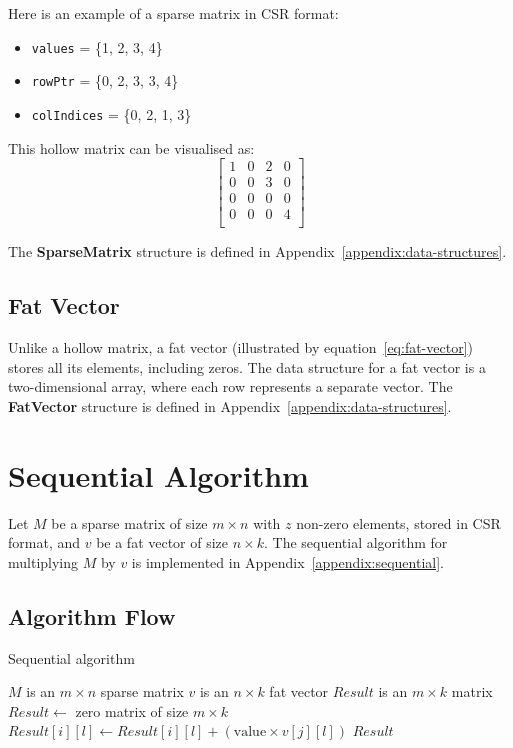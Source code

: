 \documentclass[12pt,oneside]{book} %
\begin{document}
Here is an example of a sparse matrix in CSR format:
\begin{itemize}
    \item \texttt{values} = \{1, 2, 3, 4\}
    \item \texttt{rowPtr} = \{0, 2, 3, 3, 4\}
    \item \texttt{colIndices} = \{0, 2, 1, 3\}
\end{itemize}

This hollow matrix can be visualised as:
\[
    \begin{bmatrix}
        1 & 0 & 2 & 0 \\
        0 & 0 & 3 & 0 \\
        0 & 0 & 0 & 0 \\
        0 & 0 & 0 & 4 \\
    \end{bmatrix}
\]

The \textbf{SparseMatrix} structure is defined in
Appendix~\ref{appendix:data-structures}.

\subsection{Fat Vector}
Unlike a hollow matrix, a fat vector (illustrated by
equation~\ref{eq:fat-vector}) stores all its elements, including zeros. The
data structure for a fat vector is a two-dimensional array, where each row
represents a separate vector. The \textbf{FatVector} structure is defined in
Appendix~\ref{appendix:data-structures}.

\section{Sequential Algorithm}
Let \( M \) be a sparse matrix of size \( m \times n \) with \( z \) non-zero
elements, stored in CSR format, and \( v \) be a fat vector of size \( n \times
k \). The sequential algorithm for multiplying \( M \) by \( v \) is
implemented in Appendix~\ref{appendix:sequential}.

\subsection{Algorithm Flow}

\begin{algorithm}[H]
    \caption{Sequential algorithm}
    \begin{algorithmic}
        \Require $M$ is an $m \times n$ sparse matrix
        \Require $v$ is an $n \times k$ fat vector
        \Ensure  $Result$ is an $m \times k$ matrix
        \State $Result \gets$ zero matrix of size $m \times k$
        \State $Result[i][l] \gets Result[i][l] + (\text{value} \times v[j][l])$
        \EndFor
        \EndFor
        \EndFor
        \State \Return $Result$
    \end{algorithmic}
\end{algorithm}
\end{document}
